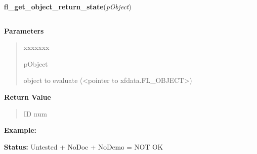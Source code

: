 \hspace{.8\funcindent}\begin{boxedminipage}{\funcwidth}

    \raggedright \textbf{fl\_get\_object\_return\_state}(\textit{pObject})

    \vspace{-1.5ex}

    \rule{\textwidth}{0.5\fboxrule}
\setlength{\parskip}{2ex}
\setlength{\parskip}{1ex}
      \textbf{Parameters}
      \vspace{-1ex}

      \begin{quote}
        \begin{Ventry}{xxxxxxx}

          \item[pObject]

          object to evaluate ({\textless}pointer to 
          xfdata.FL\_OBJECT{\textgreater})

        \end{Ventry}

      \end{quote}

      \textbf{Return Value}
    \vspace{-1ex}

      \begin{quote}
      ID num

      \end{quote}

\textbf{Example:} 

\textbf{Status:} Untested + NoDoc + NoDemo = NOT OK



    \end{boxedminipage}

    \label{xformslib:library:fl_trigger_object}

    \vspace{0.5ex}

